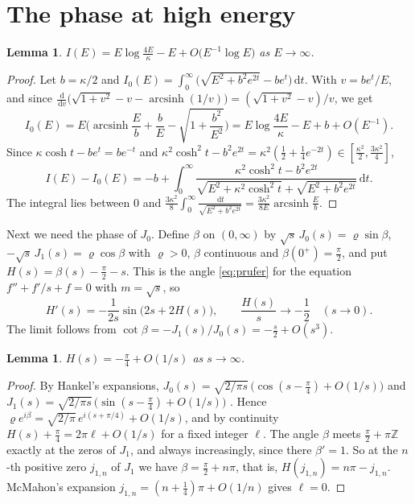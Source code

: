 \documentclass[11pt]{amsart}
\newtheorem{lemma}[theorem]{Lemma}
\theoremstyle{definition}
\newcommand{\ZZ}{\mathbb{Z}}
\newcommand{\dd}{\,\mathrm{d}}
\DeclareMathOperator{\arcsinh}{arcsinh}
\begin{document}
\section{The phase at high energy}\label{sec:asymptotics}

\begin{lemma}\label{lem:I}
$I(E)=E\log\frac{4E}{\kappa}-E+O\big(E^{-1}\log E\big)$ as $E\to\infty$.
\end{lemma}

\begin{proof}
Let $b=\kappa/2$ and $I_0(E)=\int_0^\infty\big(\sqrt{E^2+b^2e^{2t}}-be^t\big)\dd t$. With $v=be^t/E$, and since $\frac{\dd}{\dd v}\big(\sqrt{1+v^2}-v-\arcsinh(1/v)\big)=(\sqrt{1+v^2}-v)/v$, we get
\[
I_0(E)=E\Big(\arcsinh\frac Eb+\frac bE-\sqrt{1+\frac{b^2}{E^2}}\Big)=E\log\frac{4E}{\kappa}-E+b+O(E^{-1}).
\]
Since $\kappa\cosh t-be^t=be^{-t}$ and $\kappa^2\cosh^2t-b^2e^{2t}=\kappa^2(\frac12+\frac14e^{-2t})\in[\frac{\kappa^2}{2},\frac{3\kappa^2}{4}]$,
\[
I(E)-I_0(E)=-b+\int_0^\infty\frac{\kappa^2\cosh^2t-b^2e^{2t}}{\sqrt{E^2+\kappa^2\cosh^2t}+\sqrt{E^2+b^2e^{2t}}}\dd t .
\]
The integral lies between $0$ and $\frac{3\kappa^2}{8}\int_0^\infty\frac{\dd t}{\sqrt{E^2+b^2e^{2t}}}=\frac{3\kappa^2}{8E}\arcsinh\frac Eb$.
\end{proof}

Next we need the phase of $J_0$. Define $\beta$ on $(0,\infty)$ by $\sqrt{s}\,J_0(s)=\varrho\sin\beta$, $-\sqrt s\,J_1(s)=\varrho\cos\beta$ with $\varrho>0$, $\beta$ continuous and $\beta(0^+)=\frac\pi2$, and put $H(s)=\beta(s)-\frac\pi2-s$. This is the angle \eqref{eq:prufer} for the equation $f''+f'/s+f=0$ with $m=\sqrt s$, so
\begin{equation}\label{eq:Hode}
H'(s)=-\frac{1}{2s}\sin\big(2s+2H(s)\big),\qquad \frac{H(s)}{s}\to-\frac12\quad(s\to0).
\end{equation}
The limit follows from $\cot\beta=-J_1(s)/J_0(s)=-\frac s2+O(s^3)$.

\begin{lemma}\label{lem:bessel}
$H(s)=-\frac\pi4+O(1/s)$ as $s\to\infty$.
\end{lemma}

\begin{proof}
By Hankel's expansions, $J_0(s)=\sqrt{2/\pi s}\,\big(\cos(s-\frac\pi4)+O(1/s)\big)$ and $J_1(s)=\sqrt{2/\pi s}\,\big(\sin(s-\frac\pi4)+O(1/s)\big)$ \cite[\S7.21]{Wat44}. Hence $\varrho e^{i\beta}=\sqrt{2/\pi}\,e^{i(s+\pi/4)}+O(1/s)$, and by continuity $H(s)+\frac\pi4=2\pi\ell+O(1/s)$ for a fixed integer $\ell$. The angle $\beta$ meets $\frac\pi2+\pi\ZZ$ exactly at the zeros of $J_1$, and always increasingly, since there $\beta'=1$. So at the $n$-th positive zero $j_{1,n}$ of $J_1$ we have $\beta=\frac\pi2+n\pi$, that is, $H(j_{1,n})=n\pi-j_{1,n}$. McMahon's expansion $j_{1,n}=(n+\frac14)\pi+O(1/n)$ \cite[\S15.53]{Wat44} gives $\ell=0$.
\end{proof}
\end{document}
